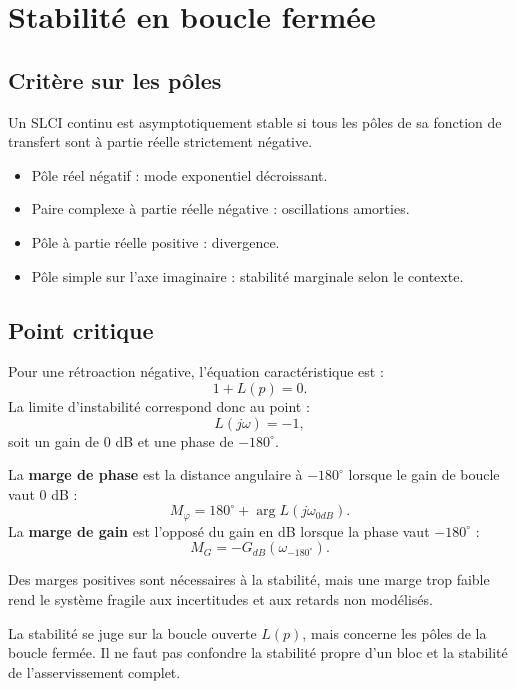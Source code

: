 \section{Stabilité en boucle fermée}\label{sec:sa-stabilite}

\subsection{Critère sur les pôles}

Un SLCI continu est asymptotiquement stable si tous les pôles de sa fonction de transfert sont à partie réelle strictement négative.

\begin{itemize}
  \item Pôle réel négatif : mode exponentiel décroissant.
  \item Paire complexe à partie réelle négative : oscillations amorties.
  \item Pôle à partie réelle positive : divergence.
  \item Pôle simple sur l'axe imaginaire : stabilité marginale selon le contexte.
\end{itemize}

\subsection{Point critique}

Pour une rétroaction négative, l'équation caractéristique est :
\[
1+L(p)=0.
\]
La limite d'instabilité correspond donc au point :
\[
L(j\omega)=-1,
\]
soit un gain de $0$ dB et une phase de $-180^\circ$.

\begin{SAdefinition}
La \textbf{marge de phase} est la distance angulaire à $-180^\circ$ lorsque le gain de boucle vaut 0 dB :
\[
M_\varphi=180^\circ+\arg L(j\omega_{0dB}).
\]
La \textbf{marge de gain} est l'opposé du gain en dB lorsque la phase vaut $-180^\circ$ :
\[
M_G=-G_{dB}(\omega_{-180^\circ}).
\]
\end{SAdefinition}

Des marges positives sont nécessaires à la stabilité, mais une marge trop faible rend le système fragile aux incertitudes et aux retards non modélisés.

\begin{SAattention}
La stabilité se juge sur la boucle ouverte $L(p)$, mais concerne les pôles de la boucle fermée. Il ne faut pas confondre la stabilité propre d'un bloc et la stabilité de l'asservissement complet.
\end{SAattention}

